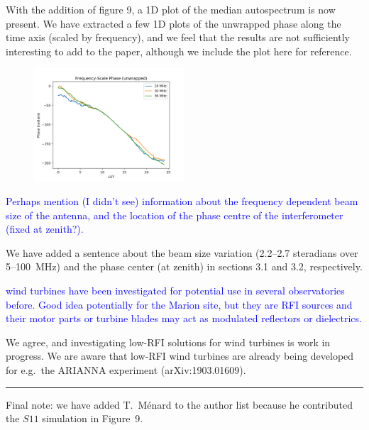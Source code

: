 \documentclass[11pt]{article}
\begin{document}
With the addition of figure 9, a 1D plot of the median autospectrum is
now present.  We have extracted a few 1D plots of the unwrapped phase
along the time axis (scaled by frequency), and we feel that the
results are not sufficiently interesting to add to the paper, although
we include the plot here for reference.
\begin{figure}[h]
  \vspace{-5pt}
  \begin{center}
    \includegraphics*[angle=0,width=0.5\textwidth]{Figures/unwrapped_phase_3freq.png}
  \end{center}
  \vspace{-5pt}
\end{figure}

\noindent \textcolor{blue}{Perhaps mention (I didn't see) information
  about the frequency dependent beam size of the antenna, and the
  location of the phase centre of the interferometer (fixed at
  zenith?).}

We have added a sentence about the beam size variation (2.2--2.7
steradians over 5--100~MHz) and the phase center (at zenith) in
sections 3.1 and 3.2, respectively.

\noindent \textcolor{blue}{wind turbines have been investigated for
  potential use in several observatories before. Good idea potentially
  for the Marion site, but they are RFI sources and their motor parts
  or turbine blades may act as modulated reflectors or dielectrics.}

We agree, and investigating low-RFI solutions for wind turbines is
work in progress.  We are aware that low-RFI wind turbines are already
being developed for e.g.\ the ARIANNA experiment (arXiv:1903.01609).

\noindent\rule{\textwidth}{0.7pt}

Final note: we have added T.~M\'enard to the author list because he
contributed the $S11$ simulation in Figure~9.
\end{document}

